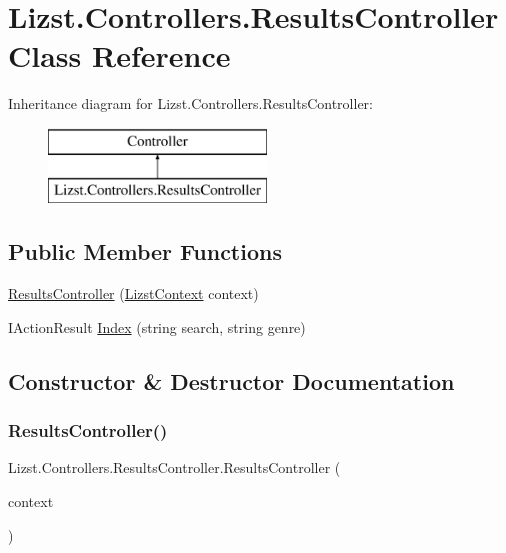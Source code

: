 \hypertarget{class_lizst_1_1_controllers_1_1_results_controller}{}\section{Lizst.\+Controllers.\+Results\+Controller Class Reference}
\label{class_lizst_1_1_controllers_1_1_results_controller}
Inheritance diagram for Lizst.\+Controllers.\+Results\+Controller\+:\begin{figure}[H]
\begin{center}
\leavevmode
\includegraphics[height=2.000000cm]{class_lizst_1_1_controllers_1_1_results_controller}
\end{center}
\end{figure}
\subsection*{Public Member Functions}
\begin{DoxyCompactItemize}
\item 
\mbox{\hyperlink{class_lizst_1_1_controllers_1_1_results_controller_acc5a9ca938d481086afec0f4ecd5caa7}{Results\+Controller}} (\mbox{\hyperlink{class_lizst_1_1_models_1_1_lizst_context}{Lizst\+Context}} context)
\item 
I\+Action\+Result \mbox{\hyperlink{class_lizst_1_1_controllers_1_1_results_controller_a55251b7496d76b52cd4aba33cef838a0}{Index}} (string search, string genre)
\end{DoxyCompactItemize}


\subsection{Constructor \& Destructor Documentation}
\mbox{\label{class_lizst_1_1_controllers_1_1_results_controller_acc5a9ca938d481086afec0f4ecd5caa7}} 
\subsubsection{\texorpdfstring{ResultsController()}{ResultsController()}}
{\footnotesize\ttfamily Lizst.\+Controllers.\+Results\+Controller.\+Results\+Controller (\begin{DoxyParamCaption}\item[{\mbox{\hyperlink{class_lizst_1_1_models_1_1_lizst_context}{Lizst\+Context}}}]{context }\end{DoxyParamCaption})}



